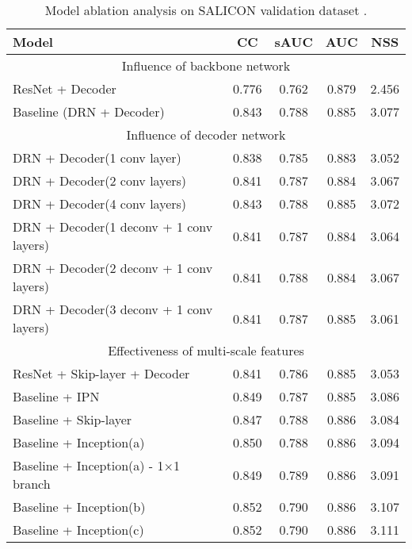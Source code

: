 \begin{table}[]
	\centering
	\scriptsize
	\caption{
		Model ablation analysis on SALICON validation dataset \cite{jiang2015salicon}.
		}
	\label{table:maa}
	\begin{tabular}{|l|cccc|}
		\hline
		Model                                & CC     & sAUC  & AUC   & NSS   \\ \hline\hline
		\multicolumn{5}{|c|}{Influence of backbone network}               \\ \hline
		ResNet + Decoder               & 0.776  & 0.762  & 0.879 & 2.456 \\ \hline
		Baseline (DRN + Decoder)       & 0.843  & 0.788 & 0.885 & 3.077 \\ \hline\hline
		\multicolumn{5}{|c|}{Influence of decoder network}               \\ \hline
		DRN + Decoder(1 conv layer)               & 0.838  & 0.785  & 0.883 & 3.052 \\ \hline
		DRN + Decoder(2 conv layers)               & 0.841  & 0.787 & 0.884 & 3.067\\ \hline
		DRN + Decoder(4 conv layers)               & 0.843  & 0.788  & 0.885 & 3.072 \\ \hline
		DRN + Decoder(1 deconv + 1 conv layers)       &0.841   & 0.787 & 0.884  & 3.064 \\ \hline			
		DRN + Decoder(2 deconv + 1 conv layers)       & 0.841  & 0.788 & 0.884 & 3.067 \\ \hline
		DRN + Decoder(3 deconv + 1 conv layers)       & 0.841  & 0.787  & 0.885 & 3.061 \\ \hline\hline						
		\multicolumn{5}{|c|}{Effectiveness of multi-scale features} \\ \hline
		ResNet + Skip-layer + Decoder & 0.841  & 0.786  & 0.885 & 3.053 \\ \hline 
		Baseline + IPN                       & 0.849   & 0.787 & 0.885 & 3.086 \\ \hline
		Baseline + Skip-layer                      & 0.847  & 0.788  & 0.886 & 3.084 \\ \hline
		Baseline + Inception(a)            & 0.850   & 0.788 & 0.886 & 3.094 \\ \hline
		Baseline + Inception(a) - 1$\times $1 branch      &0.849	&0.789	&0.886	&3.091 \\ \hline
		Baseline + Inception(b)             &0.852	&0.790	&0.886	&3.107 \\ \hline		
		Baseline + Inception(c)             & 0.852	&0.790	&0.886	&3.111 \\ \hline		

\end{tabular}
\end{table}

